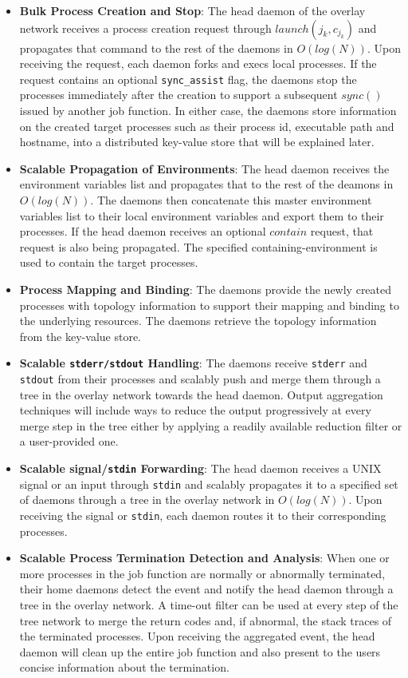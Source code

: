 \begin{itemize}
\item{{\bf Bulk Process Creation and Stop}: The head daemon of the overlay network
receives a process creation request
through $launch(j_k, c_{j_k})$ and propagates that command to the rest of the daemons
in $O(log(N))$. Upon receiving the request, each daemon forks and execs
local processes. If the request contains an optional {\tt sync\_assist} flag, the daemons
stop the processes immediately after the creation to support a subsequent $sync()$ issued
by another job function. In either case, the daemons store
information on the created target processes such as their process id, executable path
and hostname, into a distributed key-value store that will be explained later.}

\item{{\bf Scalable Propagation of Environments}: The head daemon receives the environment
variables list and propagates that to the rest of the deamons
in $O(log(N))$. The daemons then concatenate this master environment variables
list to their local environment variables and export them to their
processes. If the head daemon receives an optional $contain$ request, that
request is also being propagated. The specified containing-environment is used to contain
the target processes.}

\item{{\bf Process Mapping and Binding}: The daemons provide the newly created processes
with topology information to support their mapping and binding to the underlying 
resources. The daemons retrieve the topology information from the key-value store.}

\item{{\bf Scalable {\tt stderr/stdout} Handling}: The daemons receive
{\tt stderr} and {\tt stdout}
from their processes and scalably push and merge them through a tree in the overlay
network towards the head daemon. Output aggregation techniques
will include ways to reduce the output progressively at every merge step
in the tree either by applying a readily available
reduction filter or a user-provided one.}

\item{{\bf Scalable signal/{\tt stdin} Forwarding}: The head daemon receives a UNIX signal
or an input through {\tt stdin} and scalably propagates it to a specified set of daemons
through a tree in the overlay network in $O(log(N))$. Upon receiving the signal or {\tt stdin},
each daemon routes it to their corresponding processes.}

\item{{\bf Scalable Process Termination Detection and Analysis}: When one or more processes
in the job function are normally or abnormally terminated, their home daemons detect the event and notify
the head daemon through a tree in the overlay network. A time-out filter can be used at every step of
the tree network to merge the return codes and, if abnormal, the stack traces of 
the terminated processes. Upon receiving the aggregated
event, the head daemon will clean up the entire job function and also present
to the users concise information about the termination.}

\end{itemize}

